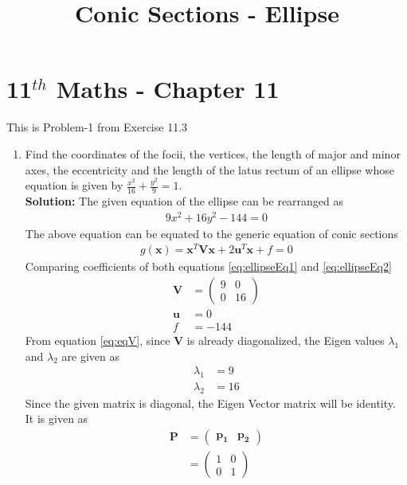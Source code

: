\documentclass[12pt]{article}
\newcommand{\solution}{\noindent \textbf{Solution: }}
\newcommand{\myvec}[1]{\ensuremath{\begin{pmatrix}#1\end{pmatrix}}}
\let\vec\mathbf
\begin{document}
\begin{center}
\title{\textbf{Conic Sections - Ellipse}}
\date{\vspace{-5ex}} %
\maketitle
\end{center}
\setcounter{page}{1}

\section{11$^{th}$ Maths - Chapter 11}
This is Problem-1 from Exercise 11.3
\begin{enumerate}
	\item Find the coordinates of the focii, the vertices, the length of major and minor axes, the eccentricity and the length of the latus rectum of an ellipse whose equation is given by $\frac{x^2}{16}+\frac{y^2}{9} = 1$. \\ 
\solution 
The given equation of the ellipse can be rearranged as
\begin{align}
    \label{eq:ellipseEq1}
    9x^2 + 16y^2-144 = 0
\end{align}
The above equation can be equated to the generic equation of conic sections
\begin{align}
	\label{eq:ellipseEq2}
	g(\vec{x}) = \vec{x}^T\vec{V}\vec{x} + 2\vec{u}^T\vec{x} + f = 0 
\end{align}
Comparing coefficients of both equations \eqref{eq:ellipseEq1} and \eqref{eq:ellipseEq2} 
\begin{align}
	\label{eq:eqV}
	\vec{V} &= \myvec{ 9 & 0 \\ 0 & 16} \\
	\label{eq:eqU}
	\vec{u} &=  0 \\
	\label{eq:eqF}
	f &= -144 
\end{align}
From equation \eqref{eq:eqV}, since $\vec{V}$ is already diagonalized, the Eigen values $\lambda_1$ and $\lambda_2$ are given as 
\begin{align}
	\label{eq:eqEigen1}
	\lambda_1 &= 9 \\
	\label{eq:eqEigen2}
	\lambda_2 &= 16 
\end{align}
Since the given matrix is diagonal, the Eigen Vector matrix will be identity. It is given as
\begin{align}
	\vec{P} &= \myvec{ \vec{p_1} & \vec{p_2}} \\
	&= \myvec{ 1 & 0 \\ 0 & 1}

\end{align}
\end{enumerate}
\end{document}
